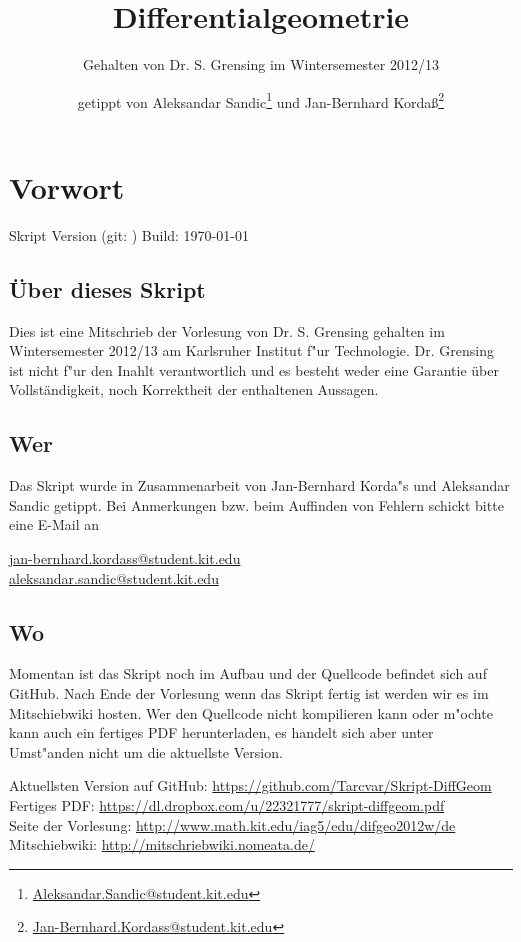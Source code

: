 \documentclass[paper=A4, twoside, chapterprefix=true, bibliography=totoc, headsepline]{scrbook}
\title{Differentialgeometrie}
\subtitle{Gehalten von Dr. S. Grensing im Wintersemester 2012/13}
\author{getippt von Aleksandar Sandic\thanks{\href{mailto:aleksandar.sandic@student.kit.edu}{Aleksandar.Sandic@student.kit.edu}} und Jan-Bernhard Korda\ss\thanks{\href{mailto:jan-bernhard.kordass@student.kit.edu}{Jan-Bernhard.Kordass@student.kit.edu}}}
\begin{document}
\maketitle

\setlength\parskip{0.6pt}
\tableofcontents

\chapter*{Vorwort}
\setlength\parskip{\smallskipamount} Skript Version \textbf{\GITVersionTag}
(git: \GITAbrHash) \quad Build: \today

\section*{\"Uber dieses Skript}
Dies ist eine Mitschrieb der Vorlesung  von Dr. S. Grensing gehalten im Wintersemester 2012/13 am Karlsruher Institut f"ur Technologie.
Dr. Grensing ist nicht f"ur den Inahlt verantwortlich und es besteht weder eine Garantie über Vollständigkeit, noch Korrektheit der enthaltenen Aussagen.

\section*{Wer}
Das Skript wurde in Zusammenarbeit von Jan-Bernhard Korda"s und Aleksandar Sandic getippt.
Bei Anmerkungen bzw. beim Auffinden von Fehlern schickt bitte eine E-Mail an
\begin{center}
  \href{mailto:jan-bernhard.kordass@student.kit.edu}{jan-bernhard.kordass@student.kit.edu}\\
  \href{mailto:aleksandar.sandic@student.kit.edu}{aleksandar.sandic@student.kit.edu}
\end{center}

\section*{Wo}
Momentan ist das Skript noch im Aufbau und der Quellcode befindet sich auf GitHub.
Nach Ende der Vorlesung wenn das Skript fertig ist werden wir es im Mitschiebwiki hosten.
Wer den Quellcode nicht kompilieren kann oder m"ochte kann auch ein fertiges PDF herunterladen, es handelt sich aber unter Umst"anden nicht um die aktuellste Version.

Aktuellsten Version auf GitHub: \url{https://github.com/Tarcvar/Skript-DiffGeom}\\
Fertiges PDF: \url{https://dl.dropbox.com/u/22321777/skript-diffgeom.pdf}\\
Seite der Vorlesung: \url{http://www.math.kit.edu/iag5/edu/difgeo2012w/de}\\
Mitschiebwiki: \url{http://mitschriebwiki.nomeata.de/}
\end{document}
